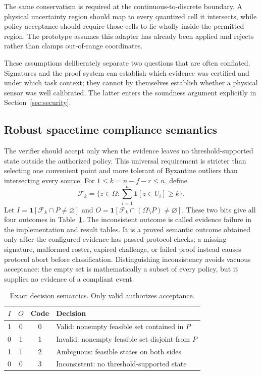 \documentclass[preprint,review,12pt]{elsarticle}
\newcommand{\F}{\mathcal{F}_k}
\newcommand{\ind}{\mathbf{1}}
\begin{document}
The same conservatism is required at the continuous-to-discrete boundary. A physical uncertainty region should map to every quantized cell it intersects, while policy acceptance should require those cells to lie wholly inside the permitted region. The prototype assumes this adapter has already been applied and rejects rather than clamps out-of-range coordinates.

These assumptions deliberately separate two questions that are often conflated. Signatures and the proof system can establish which evidence was certified and under which task context; they cannot by themselves establish whether a physical sensor was well calibrated. The latter enters the soundness argument explicitly in Section~\ref{sec:security}.

\subsection{Robust spacetime compliance semantics}
The verifier should accept only when the evidence leaves no threshold-supported state outside the authorized policy. This universal requirement is stricter than selecting one convenient point and more tolerant of Byzantine outliers than intersecting every source.
For $1\leq k=n-f-r\leq n$, define
\begin{equation}\label{eq:feasible}
 \F=\{z\in\Omega:\sum_{i=1}^{n}\ind[z\in U_i]\geq k\}.
\end{equation}
Let $I=\ind[\F\cap P\neq\varnothing]$ and $O=\ind[\F\cap(\Omega\setminus P)\neq\varnothing]$. These two bits give all four outcomes in Table~\ref{tab:decisions}. The inconsistent outcome is called evidence failure in the implementation and result tables. It is a proved semantic outcome obtained only after the configured evidence has passed protocol checks; a missing signature, malformed roster, expired challenge, or failed proof instead causes protocol abort before classification. Distinguishing inconsistency avoids vacuous acceptance: the empty set is mathematically a subset of every policy, but it supplies no evidence of a compliant event.

\begin{table}[htbp]
\centering
\caption{Exact decision semantics. Only valid authorizes acceptance.}\label{tab:decisions}
\begin{tabular}{cccl}
\toprule $I$ & $O$ & Code & Decision \\\midrule
1&0&0&Valid: nonempty feasible set contained in $P$\\
0&1&1&Invalid: nonempty feasible set disjoint from $P$\\
1&1&2&Ambiguous: feasible states on both sides\\
0&0&3&Inconsistent: no threshold-supported state\\\bottomrule
\end{tabular}
\end{table}
\end{document}
